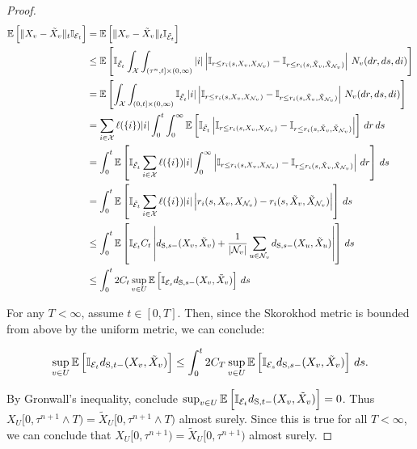 \documentclass[12pt]{article}
\newcommand{\mb}{\mathbb}
\newcommand{\mc}{\mathcal}
\newcommand{\te}{\text}
\newcommand{\ex}[1]{\mb{E}\left[#1\right]}			%
\newcommand{\sta}{\mc{X}}							%
\newcommand{\neigh}[1]{\mc{N}_{#1}}					%
\newcommand{\indx}[1]{^{#1}}						%
\newcommand{\Xf}{X}									%
\newcommand{\poiss}{N}								%
\newcommand{\Sm}{\ell}								%
\newcommand{\rate}{r}								%
\newcommand{\stmet}[1]{
\ifstrempty{#1}{
	d_{\te{S}}}{
	d_{\te{S},#1}}}									%
\newcommand{\poissv}[1]{_{#1}}						%
\newcommand{\vind}[1]{_{#1}}						%
\newcommand{\tmi}[1]{#1}							%
\newcommand{\stpara}[1]{_{#1}}						%
\newcommand{\tpara}[1]{_{#1}}						%
\newcommand{\jumpbd}[1]{C_{#1}}						%
\newcommand{\tmepro}[3]{
\ifstrempty{#3}{
	(#1,#2)}{
	(#1,#2,#3)}}									%
\newcommand{\seto}{U}								%
\newcommand{\evnt}{\mc{E}}						%
\newcommand{\indo}{n}							%
\newcommand{\alt}[1]{\tilde{#1}}					%
\newcommand{\rt}{\tau}								%
\begin{document}
\begin{proof}
\begin{align*}
\ex{\|\Xf\vind{v} - \alt{\Xf}\vind{v}\|\tpara{t}\mb{I}_{\evnt\tpara{t}}} &=\ex{\|\Xf\vind{v} - \alt{\Xf}\vind{v}\|\tpara{t}\mb{I}_{\alt{\evnt}\tpara{t}}}\\
&\leq \ex{\mb{I}_{\alt{\evnt}\tpara{t}}\int_\sta\int_{(\rt\indx{\indo},t]\times (0,\infty)} |i|\left|\mb{I}_{r \leq \rate\stpara{i}\tmepro{s}{\Xf\vind{v}}{\Xf\vind{\neigh{v}}}} - \mb{I}_{r \leq \rate\stpara{i}\tmepro{s}{\alt{\Xf}\vind{v}}{\alt{\Xf}\vind{\neigh{v}}}}\right|\,\poiss\poissv{v}(dr,ds,di)}\\
&=\ex{\int_\sta\int_{(0,t]\times (0,\infty)} \mb{I}_{\alt{\evnt}\tpara{t}}|i|\left|\mb{I}_{r \leq \rate\stpara{i}\tmepro{s}{\Xf\vind{v}}{\Xf\vind{\neigh{v}}}} - \mb{I}_{r \leq \rate\stpara{i}\tmepro{s}{\alt{\Xf}\vind{v}}{\alt{\Xf}\vind{\neigh{v}}}}\right|\,\poiss\poissv{v}(dr,ds,di)}\\
&= \sum_{i \in \sta}\Sm(\{i\})|i|\int_0^t\int_0^\infty \ex{\mb{I}_{\alt{\evnt}\tpara{t}}\left|\mb{I}_{r \leq \rate\stpara{i}\tmepro{s}{\Xf\vind{v}}{\Xf\vind{\neigh{v}}}} - \mb{I}_{r \leq \rate\stpara{i}\tmepro{s}{\alt{\Xf}\vind{v}}{\alt{\Xf}\vind{\neigh{v}}}}\right|}\,dr\,ds\\
&= \int_0^t\ex{\mb{I}_{\alt{\evnt}\tpara{t}}\sum_{i \in \sta}\Sm(\{i\})|i|\int_0^\infty\left|\mb{I}_{r \leq \rate\stpara{i}\tmepro{s}{\Xf\vind{v}}{\Xf\vind{\neigh{v}}}} - \mb{I}_{r \leq \rate\stpara{i}\tmepro{s}{\alt{\Xf}\vind{v}}{\alt{\Xf}\vind{\neigh{v}}}}\right|\,dr}\,ds\\
&= \int_0^t\ex{\mb{I}_{\alt{\evnt}\tpara{t}}\sum_{i \in \sta}\Sm(\{i\})|i|\left|\rate\stpara{i}\tmepro{s}{\Xf\vind{v}}{\Xf\vind{\neigh{v}}} - \rate\stpara{i}\tmepro{s}{\alt{\Xf}\vind{v}}{\alt{\Xf}\vind{\neigh{v}}}\right|}\,ds\\
&\leq\int_0^t\ex{\mb{I}_{\evnt\tpara{t}}\jumpbd{t}\left|\stmet{s-}(\Xf\vind{v},\alt{\Xf}\vind{v}) + \frac{1}{|\neigh{v}|}\sum_{u \in \neigh{v}} \stmet{s-}(\Xf\vind{u},\alt{\Xf}\vind{u})\right|}\,ds\\
&\leq \int_0^t2\jumpbd{t} \sup_{v \in \seto}\ex{\mb{I}_{\evnt\tpara{s}}\stmet{s-}(\Xf\vind{v},\alt{\Xf}\vind{v})}\,ds
\end{align*}

For any \(T < \infty\), assume \(t \in [0,T]\). Then, since the Skorokhod metric is bounded from above by the uniform metric, we can conclude:

\[\sup_{v \in \seto}\ex{\mb{I}_{\evnt\tpara{t}}\stmet{t-}(\Xf\vind{v},\alt{\Xf}\vind{v})} \leq \int_0^t 2\jumpbd{T}\sup_{v \in \seto}\ex{\mb{I}_{\evnt\tpara{s}}\stmet{s-}(\Xf\vind{v},\alt{\Xf}\vind{v})}\,ds.\]

By Gronwall's inequality, conclude \(\sup_{v \in \seto}\ex{\mb{I}_{\evnt\tpara{t}}\stmet{t-}(\Xf\vind{v},\alt{\Xf}\vind{v})} = 0\). Thus \(\Xf\vind{\seto}\tmi{[0,\rt\indx{\indo+1}\wedge T)} = \alt{\Xf}\vind{\seto}\tmi{[0,\rt\indx{\indo+1}\wedge T)}\) almost surely. Since this is true for all \(T < \infty\), we can conclude that \(\Xf\vind{\seto}\tmi{[0,\rt\indx{\indo+1})} = \alt{\Xf}\vind{\seto}\tmi{[0,\rt\indx{\indo+1})}\) almost surely.
\end{proof}
\end{document}
